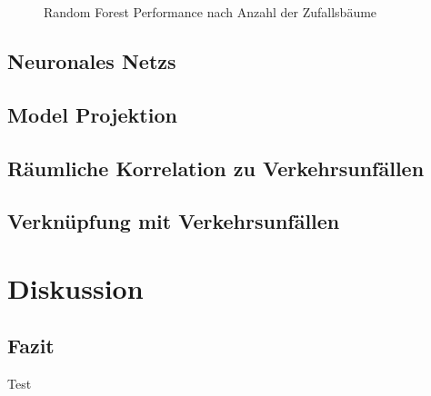 \documentclass[a4paper,12pt]{thesis}
\begin{document}
\begin{figure}%
	\centering
	\qquad
	\caption{Random Forest Performance nach Anzahl der Zufallsbäume}%
	\label{fig:NTreeValidation1}%
\end{figure}

\section{Neuronales Netzs}

\section{Model Projektion}

\section{Räumliche Korrelation zu Verkehrsunfällen}

\section{Verknüpfung mit Verkehrsunfällen}

\chapter{Diskussion}

\section{Fazit}

Test

\newpage
{}

\end{document}
